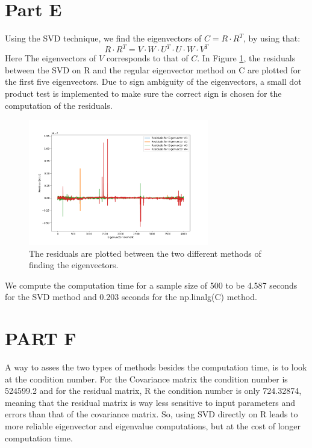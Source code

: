\documentclass[11pt]{article}
\begin{document}
\section{Part E}
Using the SVD technique, we find the eigenvectors of $C=R \cdot  R^T$, by using that:
$$R \cdot  R^T=V\cdot W\cdot U^T\cdot U\cdot W\cdot V^T$$ 
Here The eigenvectors of $V$ corresponds to that of $C$. In Figure \ref{res}, the residuals between the SVD on R and the regular eigenvector method on C are plotted for the first five eigenvectors. Due to sign ambiguity of the eigenvectors, a small dot product test is implemented to make sure the correct sign is chosen for the computation of the residuals.

\begin{figure}[!htbp]
    \centering
    \includegraphics[width=0.7\textwidth]{eigen_residuals.png}
    \caption{The residuals are plotted between the two different methods of finding the eigenvectors.}
    \label{res}
\end{figure}

We compute the computation time for a sample size of 500 to be 4.587 seconds for the SVD method and 0.203 seconds for the np.linalg(C) method. 

\section{PART F}
A way to asses the two types of methods besides the computation time, is to look at the condition number. For the Covariance matrix the condition number is 524599.2 and for the residual matrix, R the condition number is only 724.32874, meaning that the residual matrix is way less sensitive to input parameters and errors than that of the covariance matrix. 
So, using SVD directly on R leads to more reliable eigenvector and eigenvalue computations, but at the cost of longer computation time. 
\end{document}
